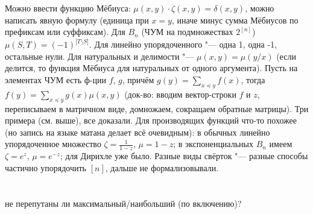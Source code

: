 Можно ввести функцию Мёбиуса: $\mu(x,y)\cdot \zeta(x, y) = \delta(x, y)$, можно написать явную формулу (единица при $x=y$, иначе минус сумма Мёбиусов
по префиксам или суффиксам).
Для $B_n$ (ЧУМ на подмножествах $2^{[n]}$) $\mu(S, T)=(-1)^{|T\setminus S|}$.
Для линейно упорядоченного "--- одна 1, одна -1, остальные нули.
Для натуральных и делимости "--- $\mu(x,y)=\mu(y/x)$ (если делится, то функция Мёбиуса для натуральных от одного аргумента).
Пусть на элементах ЧУМ есть ф-ции $f$, $g$, причём $g(y)=\sum_{x\preccurlyeq y} f(x)$, тогда $f(y)=\sum_{x\preccurlyeq y} g(x)\mu(x, y)$
(док-во: вводим вектор-строки $f$ и $z$, переписываем в матричном виде, домножаем, сокращаем обратные матрицы).
Три примера (см. выше), все доказали.
Для производящих функций что-то похожее (но запись на языке матана делает всё очевидным): в обычных линейно упорядоченное множество $\zeta=\frac{1}{1-z}$, $\mu=1-z$;
в экспоненциальных $B_n$ имеем $\zeta=e^z$, $\mu=e^{-z}$; для Дирихле уже было.
Разные виды свёрток "--- разные способы частично упорядочить $[n]$, дальше не формализовывали.

\section{} %
\TODO не перепутаны ли максимальный/наибольший (по включению)?

\section{} %
\TODO

\section{} %
\TODO
